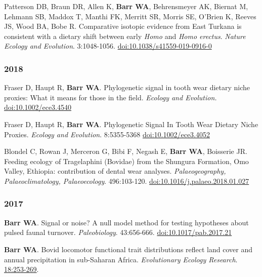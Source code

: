 \item Patterson DB, Braun DR, Allen K, {\bfseries Barr WA}, Behrensmeyer AK, Biernat M, Lehmann SB, Maddox T, Manthi FK, Merritt SR, Morris SE, O'Brien K, Reeves JS, Wood BA, Bobe R. Comparative isotopic evidence from East Turkana is consistent with a dietary shift between early \emph{Homo} and \emph{Homo erectus}. \emph{Nature Ecology and Evolution}. 3:1048-1056. \href{https://dx.doi.org/10.1038/s41559-019-0916-0}{doi:10.1038/s41559-019-0916-0}

\subsubsection*{2018}

\item Fraser D, Haupt R,  {\bfseries Barr WA}. Phylogenetic signal in tooth wear dietary niche proxies: What it means for those in the field. \emph{Ecology and Evolution.} \href{https://dx.doi.org/10.1002/ece3.4540}{doi:10.1002/ece3.4540}


\item  Fraser D, Haupt R,  {\bfseries Barr WA}. Phylogenetic Signal In Tooth Wear Dietary Niche Proxies. \emph{Ecology and Evolution}. 8:5355-5368 \href{https://doi.org/10.1002/ece3.4052}{doi:10.1002/ece3.4052}

\item  Blondel C, Rowan J, Merceron G, Bibi F,  Negash E, {\bfseries Barr WA}, Boisserie JR. Feeding ecology of Tragelaphini (Bovidae) from the Shungura Formation, Omo Valley, Ethiopia: contribution of dental wear analyses.  \emph{Palaeogeography, Palaeoclimatology, Palaeoecology}. 496:103-120. \href{https://doi.org/10.1016/j.palaeo.2018.01.027}{doi:10.1016/j.palaeo.2018.01.027}

\subsubsection*{2017}

\item  {\bfseries Barr WA}. Signal or noise? A null model method for testing hypotheses about pulsed faunal turnover. \emph{Paleobiology}. 43:656-666. \href{https://doi.org/10.1017/pab.2017.21}{doi:10.1017/pab.2017.21}

\item  {\bfseries Barr WA}. Bovid locomotor functional trait distributions reflect land cover and annual precipitation in sub-Saharan Africa. \emph{Evolutionary Ecology Research}.  \href{http://www.evolutionary-ecology.com/issues/v18/n03/ddar3051.pdf}{18:253-269}.

